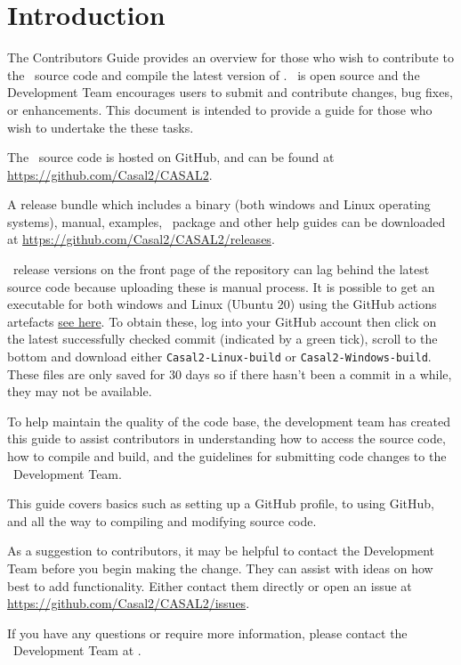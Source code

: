 \section{Introduction\label{sec:Introduction}}

The Contributors Guide provides an overview for those who wish to contribute to the \CNAME\ source code and compile the latest version of \CNAME. \CNAME\ is open source and the Development Team encourages users to submit and contribute changes, bug fixes, or enhancements. This document is intended to provide a guide for those who wish to undertake the these tasks. 

The \CNAME\ source code is hosted on GitHub, and can be found at \url{https://github.com/Casal2/CASAL2}.

A release bundle which includes a binary (both windows and Linux operating systems), manual, examples, \R\  package and other help guides can be downloaded at \url{https://github.com/Casal2/CASAL2/releases}. 

\CNAME\ release versions on the front page of the repository can lag behind the latest source code because uploading these is manual process. It is possible to get an executable for both windows and Linux (Ubuntu 20) using the GitHub actions artefacts \href{https://github.com/Casal2/CASAL2/actions}{see here}. To obtain these, log into your GitHub account then click on the latest successfully checked commit (indicated by a green tick), scroll to the bottom and download either \texttt{Casal2-Linux-build} or \texttt{Casal2-Windows-build}. These files are only saved for 30 days so if there hasn't been a commit in a while, they may not be available.

To help maintain the quality of the code base, the development team has created this guide to assist contributors in understanding how to access the source code, how to compile and build, and the guidelines for submitting code changes to the \CNAME\ Development Team.  

This guide covers basics such as setting up a GitHub profile, to using GitHub, and all the way to compiling and modifying source code. 

As a suggestion to contributors, it may be helpful to contact the Development Team before you begin making the change. They can assist with ideas on how best to add functionality. Either contact them directly or open an issue at \url{https://github.com/Casal2/CASAL2/issues}. 

If you have any questions or require more information, please contact the \CNAME\ Development Team at \email.